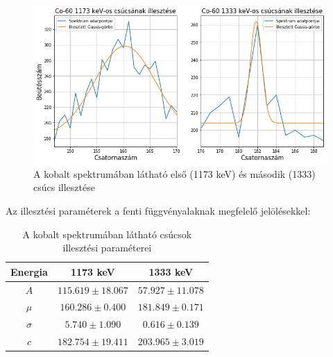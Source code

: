 \documentclass[12pt,a4paper]{article}
\begin{document}
\newpage
\begin{figure}[!h]
\hspace*{-0.75cm}
\includegraphics[scale=0.53]{Cob_figs}
\caption{A kobalt spektrumában látható első (1173 keV) és második (1333) csúcs illesztése}
\label{fig:2}
\end{figure}

Az illesztési paraméterek a fenti függvényalaknak megfelelő jelölésekkel:
\begin{table}[!h]
\begin{center}
\begin{tabular}{|c|c||c|}
\hline
Energia & 1173 keV & 1333 keV \\ 
\hline
$A$ & $115.619 \pm 18.067$ & $57.927 \pm 11.078$\\
\hline
$\mu$ & $160.286 \pm 0.400$ & $181.849 \pm 0.171$\\
\hline
$\sigma$ & $5.740 \pm 1.090$ & $0.616 \pm 0.139$ \\
\hline
$c$ & $182.754 \pm 19.411$ & $203.965 \pm 3.019$\\
\hline
\end{tabular}
\caption{A kobalt spektrumában látható csúcsok illesztési paraméterei}
\end{center}
\end{table}

\newpage
\end{document}
